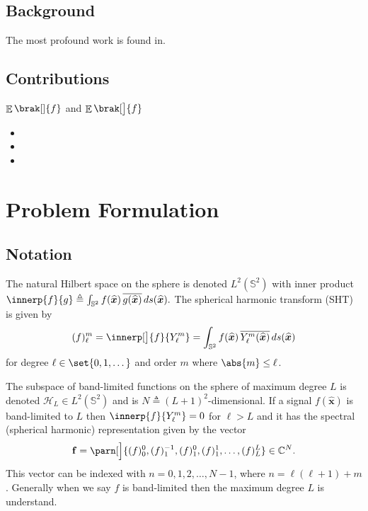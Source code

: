 \documentclass[10pt, twocolumn, twoside]{IEEEtran}
\newcommand{\untsph}{\mathbb{S}^{2}} %
\newcommand{\unit}[1]{\widehat{\bm{#1}}}
\DeclareMathOperator{\expectop}{\mathbb{E}} %
\newcommand{\expect}[2][]{\expectop\brak[#1]{#2}}
\newcommand{\cmplx}{\mathbb{C}} %
\newcommand{\dfn}{\triangleq}
\newcommand{\conj}[1]{\overline{#1}} %
\begin{document}
\subsection{Background}

\lipsum[4-6]  The most profound work is found in\cite{Kennedy-book:2013}.


\subsection{Contributions}

$\expect{f}$ and $\expect[\big]{f}$

\begin{itemize}
\item
\lipsum[17]
\item
\lipsum[18]
\item
\lipsum[19]
\end{itemize}



\newpage

\section{Problem Formulation}

\subsection{Notation}

The natural Hilbert space on the sphere is denoted $L^2(\untsph)$ with inner product
\(
	\innerp{f}{g}\dfn\int_{\untsph} f(\unit{x})\,
		\conj{g(\unit{x})}\,ds(\unit{x}).
\)
The spherical harmonic transform (SHT) is given by
\[
	(f)_{\ell}^{m}=\innerp[\big]{f}{Y_{\ell}^{m}}
	=\int_{\untsph} f(\unit{x})\,\conj{Y_{\ell}^{m}(\unit{x})}\,ds(\unit{x})
\]
for degree $\ell\in\set{0,1,\dots}$ and order $m$ where $\abs{m}\leq \ell$.

The subspace of band-limited functions on the sphere of maximum degree $L$ is denoted $\mathcal{H}_{L}\in L^2(\untsph)$ and is $N\dfn(L+1)^2$-dimensional.  If a signal $f(\unit{x})$ is band-limited to $L$ then $\innerp{f}{Y_{\ell}^{m}}=0$ for $\ell>L$ and it has the spectral (spherical harmonic) representation given by the vector
\begin{equation}
\label{eqn:f-spec}
	\mathbf{f}=\parn[\Big]{(f)_0^0, (f)_1^{-1}, (f)_1^{0}, (f)_1^{1},\dotsc, (f)_L^{L}}
	\in\cmplx^{N}.
\end{equation}
This vector can be indexed with $n=0,1,2,\dotsc,N-1$, where $n=\ell(\ell+1)+m$.  Generally when we say $f$ is band-limited then the maximum degree $L$ is understand.
\end{document}
